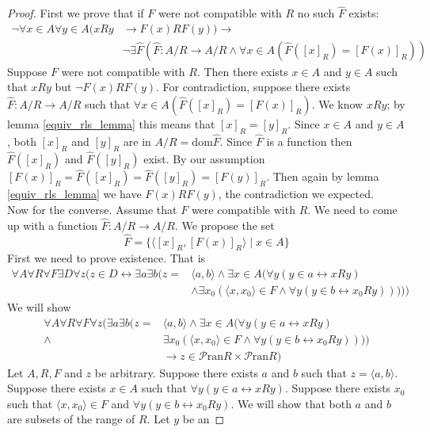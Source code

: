 \documentclass{report}
\begin{document}
\begin{proof}
First we prove that if $F$ were not compatible with $R$ no such $\hat F$ exists:
\begin{align*}
\neg\forall x\in A\forall y\in A(xRy&\to F(x)RF(y))\to\\
&\neg\exists\hat F(\hat F:A/R\to A/R\land\forall x\in A(\hat F([x]_R)=[F(x)]_R))
\end{align*}
Suppose $F$ were not compatible with $R$. Then there exists $x\in A$ and $y\in A$ such that $xRy$ but $\neg F(x)RF(y)$. For contradiction, suppose there exists $\hat F:A/R\to A/R$
such that $\forall x\in A(\hat F([x]_R)=[F(x)]_R)$. We know $xRy$; by lemma \ref{equiv_rls_lemma} this means that $[x]_R=[y]_R$. Since $x\in A$ and $y\in A$, both $[x]_R$ and $[y]_R$ are in 
$A/R=\text{dom}\hat F$. Since $\hat F$ is a function then $\hat F([x]_R)$ and $\hat F([y]_R)$ exist. By our assumption $[F(x)]_R=\hat F([x]_R)=\hat F([y]_R)=[F(y)]_R$. Then again 
by lemma \ref{equiv_rls_lemma} we have $F(x)RF(y)$, the contradiction we expected.\\
\indent Now for the converse. Assume that $F$ were compatible with $R$. We need to come up with a function $\hat F:A/R\to A/R$. We propose the set
\begin{equation*}
\hat F=\{\langle [x]_R,[F(x)]_R\rangle\mid x\in A\}
\end{equation*}
First we need to prove existence. That is
\begin{align*}
\forall A\forall R\forall F\exists D\forall z(z\in D\leftrightarrow\exists a\exists b(z=&\langle a,b\rangle\land\exists x\in A(\forall y(y\in a\leftrightarrow xRy)\\
&\land\exists x_0(\langle x,x_0\rangle\in F\land\forall y(y\in b\leftrightarrow x_0Ry)))))
\end{align*}
We will show
\begin{align*}
\forall A\forall R\forall F\forall z(\exists a\exists b(z=&\langle a,b\rangle\land\exists x\in A(\forall y(y\in a\leftrightarrow xRy)\\
\land&\exists x_0(\langle x,x_0\rangle\in F\land\forall y(y\in b\leftrightarrow x_0Ry))))\\&\to z\in\mathscr P\text{ran}R\times\mathscr P\text{ran}R)
\end{align*}
Let $A,R,F$ and $z$ be arbitrary. Suppose there exists $a$ and $b$ such that $z=\langle a,b\rangle$. Suppose there exists $x\in A$ such that $\forall y(y\in a\leftrightarrow xRy)$.
Suppose there exists $x_0$ such that $\langle x,x_0\rangle\in F$ and $\forall y(y\in b\leftrightarrow x_0Ry)$. We will show that both $a$ and $b$ are subsets of the range of $R$. Let $y$ be an 

\end{proof}
\end{document}
